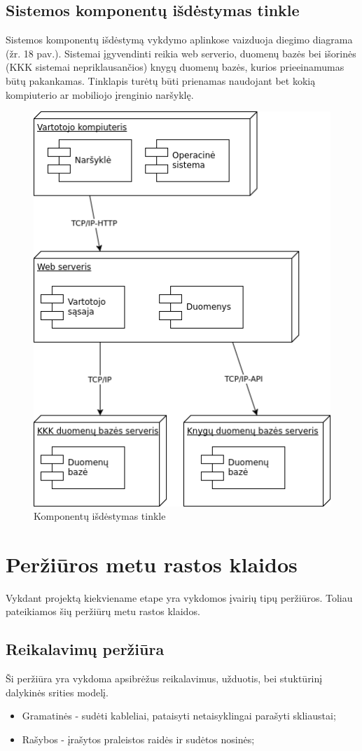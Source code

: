 \documentclass{VUMIFPSkursinis}
\begin{document}
	\subsection{Sistemos komponentų išdėstymas tinkle}
		Sistemos komponentų išdėstymą vykdymo aplinkose vaizduoja diegimo diagrama (žr. 18 pav.).
		Sistemai įgyvendinti reikia web serverio, duomenų bazės bei išorinės (KKK sistemai nepriklausančios) 
		knygų duomenų bazės, kurios prieeinamumas būtų pakankamas.
		Tinklapis turėtų būti prienamas naudojant bet kokią kompiuterio ar mobiliojo įrenginio naršyklę.
		\begin{figure}[H]
			\centering
			\includegraphics[scale=0.9]{img/Deployment.png}
			\caption{Komponentų išdėstymas tinkle}
			\label{img:psi2-deployment}
		\end{figure}



\section{Peržiūros metu rastos klaidos}
	Vykdant projektą kiekviename etape yra vykdomos įvairių tipų peržiūros.
	Toliau pateikiamos šių peržiūrų metu rastos klaidos.
	\subsection{Reikalavimų peržiūra}
		Ši peržiūra yra vykdoma apsibrėžus reikalavimus, užduotis, bei stuktūrinį dalykinės srities modelį.
		\begin{itemize}
			\item Gramatinės - sudėti kableliai, pataisyti netaisyklingai parašyti skliaustai;
			\item Rašybos - įrašytos praleistos raidės ir sudėtos nosinės;
		\end{itemize}
\end{document}
